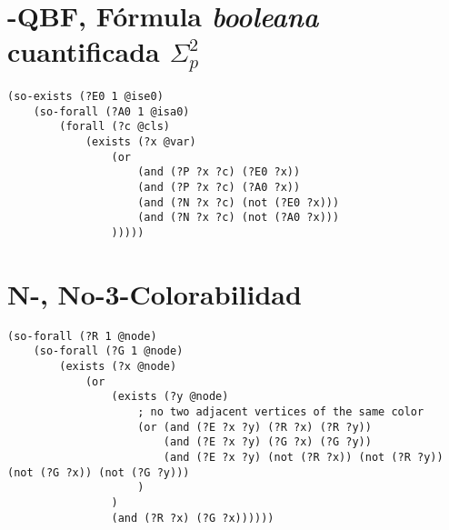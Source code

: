 \section{\qEA-QBF, Fórmula \textit{booleana} cuantificada $\Sigma_p^2$}
\begin{verbatim}
(so-exists (?E0 1 @ise0)
    (so-forall (?A0 1 @isa0)
        (forall (?c @cls)
            (exists (?x @var)
                (or
                    (and (?P ?x ?c) (?E0 ?x))
                    (and (?P ?x ?c) (?A0 ?x))
                    (and (?N ?x ?c) (not (?E0 ?x)))
                    (and (?N ?x ?c) (not (?A0 ?x)))
                )))))
\end{verbatim}

\section{N-\TCOL, No-3-Colorabilidad}

\begin{verbatim}
(so-forall (?R 1 @node)
    (so-forall (?G 1 @node)
        (exists (?x @node)
            (or 
                (exists (?y @node)
                    ; no two adjacent vertices of the same color
                    (or (and (?E ?x ?y) (?R ?x) (?R ?y))
                        (and (?E ?x ?y) (?G ?x) (?G ?y))
                        (and (?E ?x ?y) (not (?R ?x)) (not (?R ?y)) (not (?G ?x)) (not (?G ?y)))
                    )
                )
                (and (?R ?x) (?G ?x))))))
\end{verbatim}
